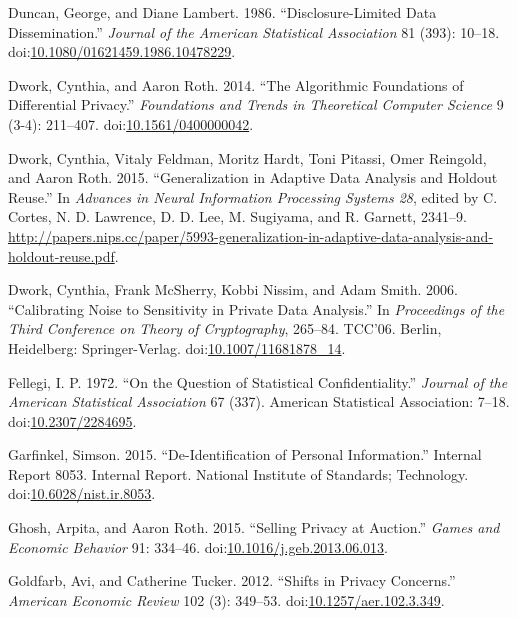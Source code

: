 \documentclass[]{article}
\begin{document}
\hypertarget{ref-Duncan:Lambert:1986}{}
Duncan, George, and Diane Lambert. 1986. ``Disclosure-Limited Data
Dissemination.'' \emph{Journal of the American Statistical Association}
81 (393): 10--18.
doi:\href{https://doi.org/10.1080/01621459.1986.10478229}{10.1080/01621459.1986.10478229}.

\hypertarget{ref-Dwork:Roth:journal:version:2014}{}
Dwork, Cynthia, and Aaron Roth. 2014. ``The Algorithmic Foundations of
Differential Privacy.'' \emph{Foundations and Trends in Theoretical
Computer Science} 9 (3-4): 211--407.
doi:\href{https://doi.org/10.1561/0400000042}{10.1561/0400000042}.

\hypertarget{ref-Dwork:Generalization:NIPS:2015}{}
Dwork, Cynthia, Vitaly Feldman, Moritz Hardt, Toni Pitassi, Omer
Reingold, and Aaron Roth. 2015. ``Generalization in Adaptive Data
Analysis and Holdout Reuse.'' In \emph{Advances in Neural Information
Processing Systems 28}, edited by C. Cortes, N. D. Lawrence, D. D. Lee,
M. Sugiyama, and R. Garnett, 2341--9.
\url{http://papers.nips.cc/paper/5993-generalization-in-adaptive-data-analysis-and-holdout-reuse.pdf}.

\hypertarget{ref-Dworketal:2006}{}
Dwork, Cynthia, Frank McSherry, Kobbi Nissim, and Adam Smith. 2006.
``Calibrating Noise to Sensitivity in Private Data Analysis.'' In
\emph{Proceedings of the Third Conference on Theory of Cryptography},
265--84. TCC'06. Berlin, Heidelberg: Springer-Verlag.
doi:\href{https://doi.org/10.1007/11681878_14}{10.1007/11681878\_14}.

\hypertarget{ref-Fellegi:1972}{}
Fellegi, I. P. 1972. ``On the Question of Statistical Confidentiality.''
\emph{Journal of the American Statistical Association} 67 (337).
American Statistical Association: 7--18.
doi:\href{https://doi.org/10.2307/2284695}{10.2307/2284695}.

\hypertarget{ref-Garfinkel:Deidentification:NIST:2015}{}
Garfinkel, Simson. 2015. ``De-Identification of Personal Information.''
Internal Report 8053. Internal Report. National Institute of Standards;
Technology.
doi:\href{https://doi.org/10.6028/nist.ir.8053}{10.6028/nist.ir.8053}.

\hypertarget{ref-Ghosh:Auction:GEB:2015}{}
Ghosh, Arpita, and Aaron Roth. 2015. ``Selling Privacy at Auction.''
\emph{Games and Economic Behavior} 91: 334--46.
doi:\href{https://doi.org/10.1016/j.geb.2013.06.013}{10.1016/j.geb.2013.06.013}.

\hypertarget{ref-Goldfarb:Shifts:AERPP:2012}{}
Goldfarb, Avi, and Catherine Tucker. 2012. ``Shifts in Privacy
Concerns.'' \emph{American Economic Review} 102 (3): 349--53.
doi:\href{https://doi.org/10.1257/aer.102.3.349}{10.1257/aer.102.3.349}.
\end{document}
